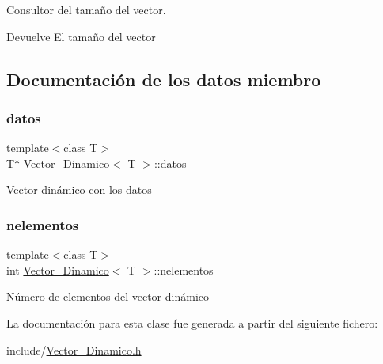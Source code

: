 Consultor del tamaño del vector. 

\begin{DoxyReturn}{Devuelve}
El tamaño del vector 
\end{DoxyReturn}


\subsection{Documentación de los datos miembro}
\mbox{\label{classVector__Dinamico_a979957915b8a7b247d62720d7afed600}} 
\subsubsection{\texorpdfstring{datos}{datos}}
{\footnotesize\ttfamily template$<$class T$>$ \\
T$\ast$ \mbox{\hyperlink{classVector__Dinamico}{Vector\+\_\+\+Dinamico}}$<$ T $>$\+::datos\hspace{0.3cm}{\ttfamily [private]}}

Vector dinámico con los datos \mbox{\label{classVector__Dinamico_afdc191eed18585e94d6f192b2dda15be}} 
\subsubsection{\texorpdfstring{nelementos}{nelementos}}
{\footnotesize\ttfamily template$<$class T$>$ \\
int \mbox{\hyperlink{classVector__Dinamico}{Vector\+\_\+\+Dinamico}}$<$ T $>$\+::nelementos\hspace{0.3cm}{\ttfamily [private]}}

Número de elementos del vector dinámico 

La documentación para esta clase fue generada a partir del siguiente fichero\+:\begin{DoxyCompactItemize}
\item 
include/\mbox{\hyperlink{Vector__Dinamico_8h}{Vector\+\_\+\+Dinamico.\+h}}\end{DoxyCompactItemize}
